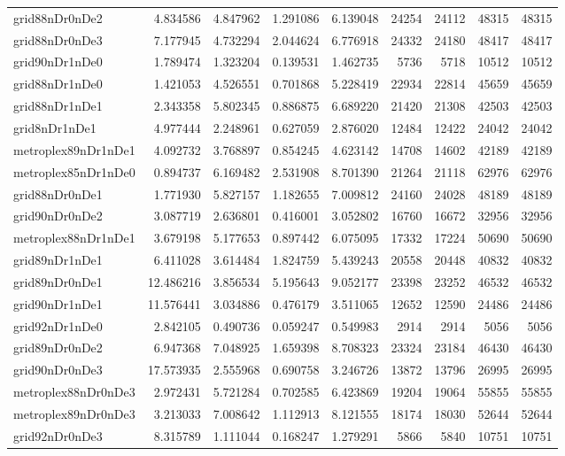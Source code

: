 \begin{longtable}{|l|r|r|r|r|r|r|r|r|}
grid88nDr0nDe2 & 4.834586 & 4.847962 & 1.291086 & 6.139048 & 24254 & 24112 & 48315 & 48315 \\
grid88nDr0nDe3 & 7.177945 & 4.732294 & 2.044624 & 6.776918 & 24332 & 24180 & 48417 & 48417 \\
grid90nDr1nDe0 & 1.789474 & 1.323204 & 0.139531 & 1.462735 & 5736 & 5718 & 10512 & 10512 \\
grid88nDr1nDe0 & 1.421053 & 4.526551 & 0.701868 & 5.228419 & 22934 & 22814 & 45659 & 45659 \\
grid88nDr1nDe1 & 2.343358 & 5.802345 & 0.886875 & 6.689220 & 21420 & 21308 & 42503 & 42503 \\
grid8nDr1nDe1 & 4.977444 & 2.248961 & 0.627059 & 2.876020 & 12484 & 12422 & 24042 & 24042 \\
metroplex89nDr1nDe1 & 4.092732 & 3.768897 & 0.854245 & 4.623142 & 14708 & 14602 & 42189 & 42189 \\
metroplex85nDr1nDe0 & 0.894737 & 6.169482 & 2.531908 & 8.701390 & 21264 & 21118 & 62976 & 62976 \\
grid88nDr0nDe1 & 1.771930 & 5.827157 & 1.182655 & 7.009812 & 24160 & 24028 & 48189 & 48189 \\
grid90nDr0nDe2 & 3.087719 & 2.636801 & 0.416001 & 3.052802 & 16760 & 16672 & 32956 & 32956 \\
metroplex88nDr1nDe1 & 3.679198 & 5.177653 & 0.897442 & 6.075095 & 17332 & 17224 & 50690 & 50690 \\
grid89nDr1nDe1 & 6.411028 & 3.614484 & 1.824759 & 5.439243 & 20558 & 20448 & 40832 & 40832 \\
grid89nDr0nDe1 & 12.486216 & 3.856534 & 5.195643 & 9.052177 & 23398 & 23252 & 46532 & 46532 \\
grid90nDr1nDe1 & 11.576441 & 3.034886 & 0.476179 & 3.511065 & 12652 & 12590 & 24486 & 24486 \\
grid92nDr1nDe0 & 2.842105 & 0.490736 & 0.059247 & 0.549983 & 2914 & 2914 & 5056 & 5056 \\
grid89nDr0nDe2 & 6.947368 & 7.048925 & 1.659398 & 8.708323 & 23324 & 23184 & 46430 & 46430 \\
grid90nDr0nDe3 & 17.573935 & 2.555968 & 0.690758 & 3.246726 & 13872 & 13796 & 26995 & 26995 \\
metroplex88nDr0nDe3 & 2.972431 & 5.721284 & 0.702585 & 6.423869 & 19204 & 19064 & 55855 & 55855 \\
metroplex89nDr0nDe3 & 3.213033 & 7.008642 & 1.112913 & 8.121555 & 18174 & 18030 & 52644 & 52644 \\
grid92nDr0nDe3 & 8.315789 & 1.111044 & 0.168247 & 1.279291 & 5866 & 5840 & 10751 & 10751 \\

\end{longtable}
